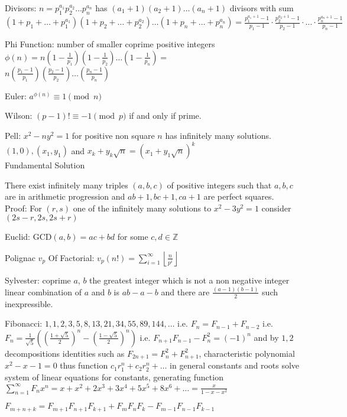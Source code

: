 Divisors: $n=p_1^{a_1} p_2^{a_2} \dots p_n^{a_n}$ has $(a_1 + 1)(a_2 + 1) \dots (a_n + 1)$ divisors with sum $(1+p_1+ \dots + p_1^{a_1})(1+p_2+ \dots + p_2^{a_2}) \dots (1+p_n+ \dots + p_n^{a_n}) = \frac{p_1^{a_1+1}-1}{p_1-1} \cdot \frac{p_2^{a_2+1}-1}{p_2-1} \cdot \dots \cdot \frac{p_n^{a_n+1}-1}{p_n-1}$

Phi Function: number of smaller coprime positive integers $\phi(n)=n\left(1-\frac{1}{p_1}\right)\left(1-\frac{1}{p_2}\right)\dots\left(1-\frac{1}{p_n}\right)=$ \\
$n\left(\frac{p_1-1}{p_1}\right)\left(\frac{p_2-1}{p_2}\right)\dots\left(\frac{p_n-1}{p_n}\right)$

Euler: $a^{\phi (n)} \equiv 1 \pmod{n}$

Wilson: $(p-1)! \equiv -1 \pmod{p}$ if and only if prime.

Pell: $x^2-ny^2=1$ for positive non square $n$ has infinitely many solutions. \\
$(1,0), (x_1,y_1)$ and $x_k+y_k \sqrt{n}=(x_1+y_1 \sqrt{n})^k$ \\
Fundamental Solution

There exist infinitely many triples $(a,b,c)$ of positive integers such that $a,b,c$ are in arithmetic progression and $ab+1,bc+1,ca+1$ are perfect squares. \\
Proof: For $(r,s)$ one of the infinitely many solutions to $x^2-3y^2=1$ consider $(2s-r,2s,2s+r)$

Euclid: $\text{GCD}(a,b)=ac+bd$ for some $c,d \in \mathbb{Z}$

Polignac $v_p$ Of Factorial: $v_p (n!)=\sum_{i=1}^{\infty} \left\lfloor \frac{n}{p^i} \right\rfloor$

Sylvester: coprime $a$, $b$ the greatest integer which is not a non negative integer linear combination of $a$ and $b$ is $ab-a-b$ and there are $\frac{(a-1)(b-1)}{2}$ such inexpressible.

Fibonacci: $1,1,2,3,5,8,13,21,34,55,89,144,\dots$ i.e. $F_n=F_{n-1}+F_{n-2}$ i.e. $F_n = \frac{1}{\sqrt{5}} \left(\left(\frac{1+\sqrt{5}}{2} \right)^n - \left(\frac{1-\sqrt{5}}{2} \right)^n \right)$ i.e. $F_{n+1} F_{n-1} - F_n^2=(-1)^n$ and by $1,2$ decompositions identities such as $F_{2n+1}=F_{n}^2+F_{n+1}^2$, characteristic polynomial $x^2-x-1=0$ thus function $c_1 r_1^n + c_2 r_2^n + \dots$ in general constants and roots solve system of linear equations for constants, generating function $\sum_{n=1}^{\infty} F_n x^n = x+x^2+2 x^3+3 x^4+5 x^5+8 x^6+\dots = \frac{x}{1-x-x^2}$

$F_{m+n+k}=F_{m+1}F_{n+1}F_{k+1}+F_{m}F_{n}F_{k}-F_{m-1}F_{n-1}F_{k-1}$

